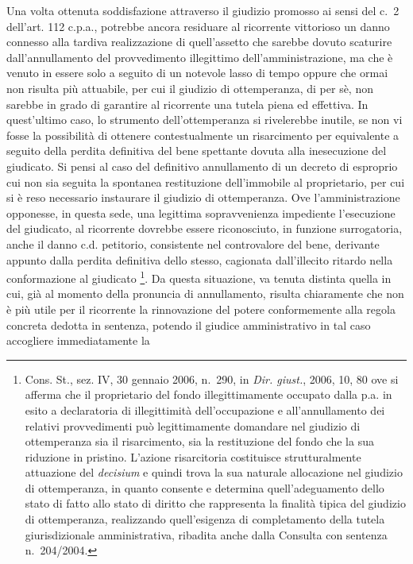 \documentclass[12pt,it,a4paper,]{report}
\begin{document}
Una volta ottenuta soddisfazione attraverso il giudizio promosso ai
sensi del c.~2 dell'art. 112 c.p.a., potrebbe ancora residuare al
ricorrente vittorioso un danno connesso alla tardiva realizzazione di
quell'assetto che sarebbe dovuto scaturire dall'annullamento del
provvedimento illegittimo dell'amministrazione, ma che è venuto in
essere solo a seguito di un notevole lasso di tempo oppure che ormai non
risulta più attuabile, per cui il giudizio di ottemperanza, di per sè,
non sarebbe in grado di garantire al ricorrente una tutela piena ed
effettiva. In quest'ultimo caso, lo strumento dell'ottemperanza si
rivelerebbe inutile, se non vi fosse la possibilità di ottenere
contestualmente un risarcimento per equivalente a seguito della perdita
definitiva del bene spettante dovuta alla inesecuzione del giudicato. Si
pensi al caso del definitivo annullamento di un decreto di esproprio cui
non sia seguita la spontanea restituzione dell'immobile al proprietario,
per cui si è reso necessario instaurare il giudizio di ottemperanza. Ove
l'amministrazione opponesse, in questa sede, una legittima
sopravvenienza impediente l'esecuzione del giudicato, al ricorrente
dovrebbe essere riconosciuto, in funzione surrogatoria, anche il danno
c.d. petitorio, consistente nel controvalore del bene, derivante appunto
dalla perdita definitiva dello stesso, cagionata dall'illecito ritardo
nella conformazione al giudicato \footnote{Cons. St., sez. IV, 30
  gennaio 2006, n.~290, in \emph{Dir. giust.}, 2006, 10, 80 ove si
  afferma che il proprietario del fondo illegittimamente occupato dalla
  p.a. in esito a declaratoria di illegittimità dell'occupazione e
  all'annullamento dei relativi provvedimenti può legittimamente
  domandare nel giudizio di ottemperanza sia il risarcimento, sia la
  restituzione del fondo che la sua riduzione in pristino. L'azione
  risarcitoria costituisce strutturalmente attuazione del
  \emph{decisium} e quindi trova la sua naturale allocazione nel
  giudizio di ottemperanza, in quanto consente e determina
  quell'adeguamento dello stato di fatto allo stato di diritto che
  rappresenta la finalità tipica del giudizio di ottemperanza,
  realizzando quell'esigenza di completamento della tutela
  giurisdizionale amministrativa, ribadita anche dalla Consulta con
  sentenza n.~204/2004.}. Da questa situazione, va tenuta distinta
quella in cui, già al momento della pronuncia di annullamento, risulta
chiaramente che non è più utile per il ricorrente la rinnovazione del
potere conformemente alla regola concreta dedotta in sentenza, potendo
il giudice amministrativo in tal caso accogliere immediatamente la
\end{document}
